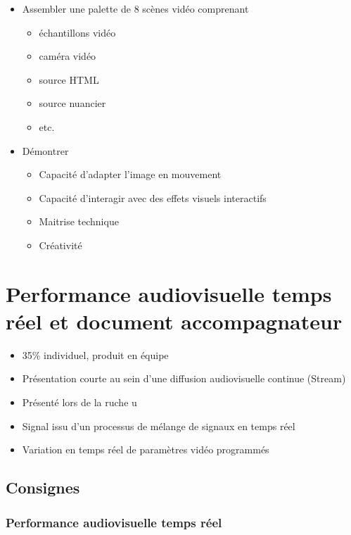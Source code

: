\documentclass[
]{book}
\providecommand{\tightlist}{%
  \setlength{\itemsep}{0pt}\setlength{\parskip}{0pt}}
\begin{document}
\begin{itemize}
\tightlist
\item
  Assembler une palette de 8 scènes vidéo comprenant

  \begin{itemize}
  \tightlist
  \item
    échantillons vidéo
  \item
    caméra vidéo
  \item
    source HTML
  \item
    source nuancier
  \item
    etc.
  \end{itemize}
\item
  Démontrer

  \begin{itemize}
  \tightlist
  \item
    Capacité d'adapter l'image en mouvement
  \item
    Capacité d'interagir avec des effets visuels interactifs
  \item
    Maitrise technique
  \item
    Créativité
  \end{itemize}
\end{itemize}

\hypertarget{sommatif_5}{%
\section{Performance audiovisuelle temps réel et document accompagnateur}\label{sommatif_5}}

\begin{itemize}
\tightlist
\item
  35\% individuel, produit en équipe
\item
  Présentation courte au sein d'une diffusion audiovisuelle continue (Stream)
\item
  Présenté lors de la ruche u
\item
  Signal issu d'un processus de mélange de signaux en temps réel
\item
  Variation en temps réel de paramètres vidéo programmés
\end{itemize}

\hypertarget{consignes-4}{%
\subsection{Consignes}\label{consignes-4}}

\hypertarget{performance-audiovisuelle-temps-ruxe9el}{%
\subsubsection{Performance audiovisuelle temps réel}\label{performance-audiovisuelle-temps-ruxe9el}}
\end{document}
